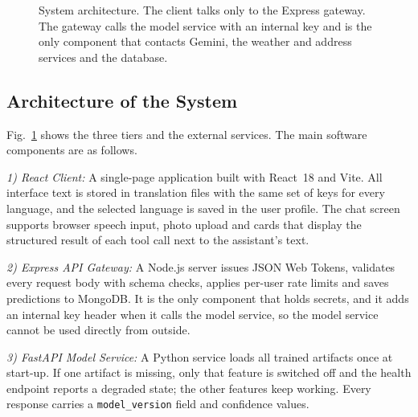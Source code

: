 \documentclass[conference]{IEEEtran}
\begin{document}
\begin{figure}[t]
\caption{System architecture. The client talks only to the Express gateway. The gateway calls the model service with an internal key and is the only component that contacts Gemini, the weather and address services and the database.}
\label{fig:arch}
\end{figure}

\subsection{Architecture of the System}
Fig.~\ref{fig:arch} shows the three tiers and the external services. The main software components are as follows.

\textit{1) React Client:} A single-page application built with React~18 and Vite. All interface text is stored in translation files with the same set of keys for every language, and the selected language is saved in the user profile. The chat screen supports browser speech input, photo upload and cards that display the structured result of each tool call next to the assistant's text.

\textit{2) Express API Gateway:} A Node.js server issues JSON Web Tokens, validates every request body with schema checks, applies per-user rate limits and saves predictions to MongoDB. It is the only component that holds secrets, and it adds an internal key header when it calls the model service, so the model service cannot be used directly from outside.

\textit{3) FastAPI Model Service:} A Python service loads all trained artifacts once at start-up. If one artifact is missing, only that feature is switched off and the health endpoint reports a degraded state; the other features keep working. Every response carries a \texttt{model\_version} field and confidence values.
\end{document}

